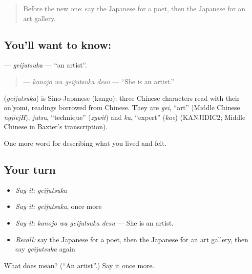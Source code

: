 \begin{quote}
Before the new one: say the Japanese for a poet, then the Japanese for an art gallery.
\end{quote}

\subsection*{You'll want to know: }
\textbf{} — \emph{geijutsuka} — \textquotedblleft{}an artist\textquotedblright{}.

\begin{quote}
\textbf{ } — \emph{kanojo wa geijutsuka desu} — \textquotedblleft{}She is an artist.\textquotedblright{}
\end{quote}

\begin{cousinweb}
\textbf{} (\emph{geijutsuka}) is Sino-Japanese (kango): three Chinese characters read with their on'yomi, readings borrowed from Chinese. They are \emph{gei}, \textquotedblleft{}art\textquotedblright{} (Middle Chinese \emph{ngjiejH}), \emph{jutsu}, \textquotedblleft{}technique\textquotedblright{} (\emph{zywit}) and \emph{ka}, \textquotedblleft{}expert\textquotedblright{} (\emph{kae}) (KANJIDIC2; Middle Chinese in Baxter's transcription).
\end{cousinweb}

\begin{grammarlens}[title={What you've built}]
One more word for describing what you lived and felt.
\end{grammarlens}

\subsection*{Your turn}
\begin{itemize}
\raggedright
  \item \emph{Say it:} \emph{geijutsuka}
  \item \emph{Say it:} \emph{geijutsuka}, once more
  \item \emph{Say it:} \emph{kanojo wa geijutsuka desu} — She is an artist.
  \item \emph{Recall:} say the Japanese for a poet, then the Japanese for an art gallery, then say \emph{geijutsuka} again
\end{itemize}

\begin{tcolorbox}[breakable,colback=teal!4,colframe=teal!35!black,title={Before you move on}]
What does  mean? (\textquotedblleft{}An artist\textquotedblright{}.) Say it once more.
\end{tcolorbox}
